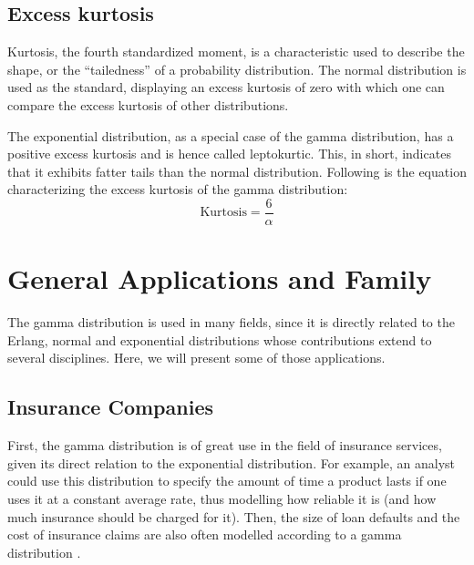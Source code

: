 \documentclass[12pt]{article}
\begin{document}
\subsection{Excess kurtosis}
Kurtosis, the fourth standardized moment, is a characteristic used to describe the shape, or the “tailedness” of a
probability distribution. The normal distribution is used as the standard, displaying an excess kurtosis of zero with
which one can compare the excess kurtosis of other distributions\cite{wikipediaKurtosis2022}.

The exponential distribution, as a special case of the gamma distribution, has a positive excess kurtosis and is hence
called leptokurtic. This, in short, indicates that it exhibits fatter tails than the normal distribution. Following is
the equation characterizing the excess kurtosis of the gamma distribution\cite{wikipediaKurtosis2022}:
\begin{equation}
	\text{Kurtosis} = \frac{6}{\alpha}
\end{equation}


\pagebreak
\section{General Applications and Family}\label{sec:generalApplications}

The gamma distribution is used in many fields, since it is directly related to the Erlang, normal and exponential
distributions whose contributions extend to several disciplines. Here, we will present some of those applications.

\subsection{Insurance Companies}
First, the gamma distribution is of great use in the field of insurance services, given its direct relation to the
exponential distribution. For example, an analyst could use this distribution to specify the amount of time a product
lasts if one uses it at a constant average rate, thus modelling how reliable it is (and how much insurance should be
charged for it). Then, the size of loan defaults and the cost of insurance claims are also often modelled according to a
gamma distribution \cite{tiwariModelingInsuranceClaim2020}.
\end{document}

